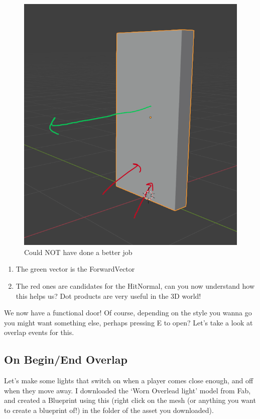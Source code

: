 \documentclass[]{article}
\begin{document}
	\begin{figure}[h]
		\centering
		\includegraphics[width=1\linewidth]{day4images/screenshot012}
		\caption{Could NOT have done a better job}
		\label{fig:screenshot012}
	\end{figure}
	
	\begin{enumerate}
		\item The green vector is the ForwardVector
		\item The red ones are candidates for the HitNormal, can you now understand how this helps us? Dot products are very useful in the 3D world!
	\end{enumerate}
	
	We now have a functional door! Of course, depending on the style you wanna go you might want something else, perhaps pressing E to open? Let's take a look at overlap events for this.
	
	\subsection{On Begin/End Overlap}
	
	Let's make some lights that switch on when a player comes close enough, and off when they move away. I downloaded the `Worn Overlead light' model from Fab, and created a Blueprint using this (right click on the mesh (or anything you want to create a blueprint of!) in the folder of the asset you downloaded).
	
\end{document}
